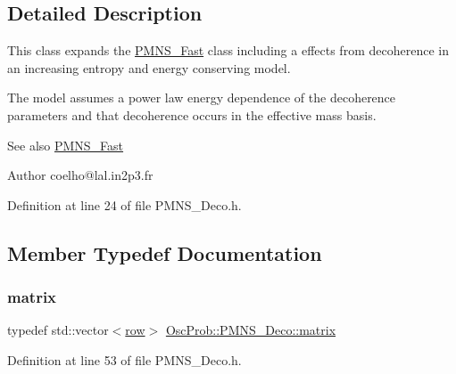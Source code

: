 \subsection{Detailed Description}
This class expands the \hyperlink{classOscProb_1_1PMNS__Fast}{P\+M\+N\+S\+\_\+\+Fast} class including a effects from decoherence in an increasing entropy and energy conserving model.

The model assumes a power law energy dependence of the decoherence parameters and that decoherence occurs in the effective mass basis.

\begin{DoxySeeAlso}{See also}
\hyperlink{classOscProb_1_1PMNS__Fast}{P\+M\+N\+S\+\_\+\+Fast}
\end{DoxySeeAlso}
\begin{DoxyAuthor}{Author}
coelho@lal.\+in2p3.\+fr 
\end{DoxyAuthor}


Definition at line 24 of file P\+M\+N\+S\+\_\+\+Deco.\+h.



\subsection{Member Typedef Documentation}
\mbox{\label{classOscProb_1_1PMNS__Deco_a77b4e0c041b6268910a270be0f5387c9}} 
\subsubsection{\texorpdfstring{matrix}{matrix}}
{\footnotesize\ttfamily typedef std\+::vector$<$\hyperlink{classOscProb_1_1PMNS__Deco_a430859c3da89582de577f8f7e75f2d16}{row}$>$ \hyperlink{classOscProb_1_1PMNS__Deco_a77b4e0c041b6268910a270be0f5387c9}{Osc\+Prob\+::\+P\+M\+N\+S\+\_\+\+Deco\+::matrix}}



Definition at line 53 of file P\+M\+N\+S\+\_\+\+Deco.\+h.

\mbox{\label{classOscProb_1_1PMNS__Deco_a430859c3da89582de577f8f7e75f2d16}} 

